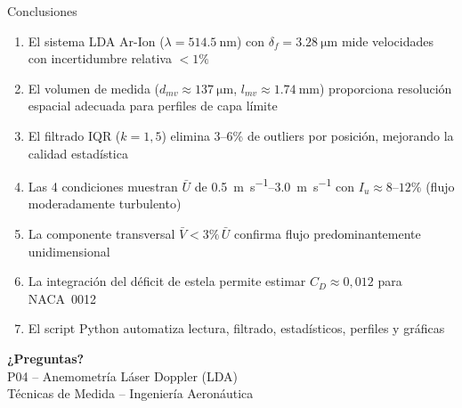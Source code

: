 \documentclass[aspectratio=169,12pt]{beamer}
\begin{document}
\begin{frame}{Conclusiones}
	\begin{enumerate}
		\item El sistema LDA Ar-Ion ($\lambda = \SI{514,5}{\nm}$) con
		      $\delta_f = \SI{3,28}{\micro\m}$ mide velocidades con
		      incertidumbre relativa $< 1\%$
		\item El volumen de medida
		      ($d_{mv} \approx \SI{137}{\micro\m}$,
		      $l_{mv} \approx \SI{1,74}{\mm}$) proporciona resolución
		      espacial adecuada para perfiles de capa límite
		\item El filtrado IQR ($k = 1{,}5$) elimina 3--6\% de
		      outliers por posición, mejorando la calidad estadística
		\item Las 4 condiciones muestran $\bar{U}$ de
		      \SIrange{0,5}{3,0}{\m\per\s} con $I_u \approx 8$--$12\%$
		      (flujo moderadamente turbulento)
		\item La componente transversal $\bar{V} < 3\%\,\bar{U}$
		      confirma flujo predominantemente unidimensional
		\item La integración del déficit de estela permite estimar
		      $C_D \approx 0{,}012$ para NACA~0012
		\item El script Python automatiza lectura, filtrado,
		      estadísticos, perfiles y gráficas
	\end{enumerate}

	\vspace{0.3em}
	\centering
\end{frame}

\begin{frame}{}
	\centering
	\vspace{2cm}
	{\Huge\color{aerogreen}\bfseries ¿Preguntas?}\\[1cm]
	{\large P04 -- Anemometría Láser Doppler (LDA)}\\[0.5cm]
	{\small Técnicas de Medida -- Ingeniería Aeronáutica}
\end{frame}
\end{document}
